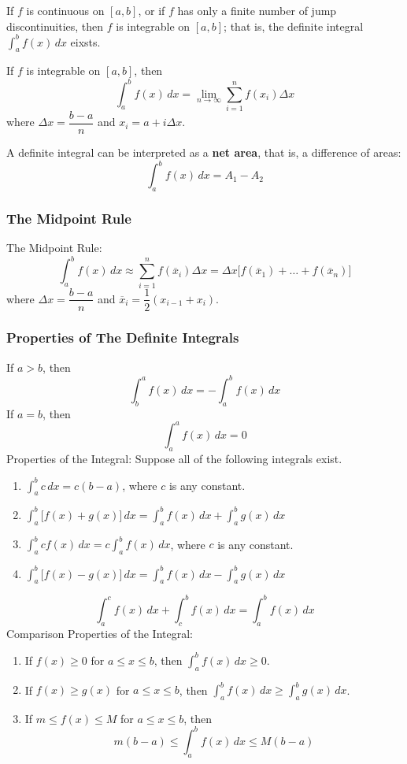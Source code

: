 \begin{theorem}
    If \(f\) is continuous on \([a,b]\), or if \(f\) has only a finite number
    of jump discontinuities, then \(f\) is integrable on \([a,b]\); that is,
    the definite integral \(\displaystyle{\int_a^b f(x)\,dx}\) eixsts.
\end{theorem}
\begin{theorem}
    If \(f\) is integrable on \([a,b]\), then
    \[\int_a^b f(x)\,dx=\lim_{n\to\infty}\sum_{i=1}^nf(x_i)\Delta x\]
    where \(\Delta x=\dfrac{b-a}{n}\) and \(x_i=a+i\Delta x\).
\end{theorem}
A definite integral can be interpreted as a \textbf{net area}, that is, a
difference of areas:
\[\int_a^b f(x)\,dx=A_1-A_2\]

\subsubsection*{The Midpoint Rule}
The Midpoint Rule:
\[\int_a^b f(x)\,dx\approx \sum_{i=1}^n f(\overline{x}_i)\Delta x
=\Delta x\big[f(\overline{x}_1)+\dots+f(\overline{x}_n)\big]\]
where \(\Delta x=\dfrac{b-a}{n}\) and
\(\overline{x}_i=\dfrac{1}{2}(x_{i-1}+x_i)\).

\subsubsection*{Properties of The Definite Integrals}
If \(a>b\), then
\[\int_b^a f(x)\,dx=-\int_a^b f(x)\,dx\]
If \(a=b\), then
\[\int_a^a f(x)\,dx=0\]
Properties of the Integral: Suppose all of the following integrals exist.
\begin{enumerate}
    \item \(\displaystyle{\int_a^b c\,dx=c(b-a)}\), where \(c\) is any
    constant.
    \item \(\displaystyle{\int_a^b\big[f(x)+g(x)\big]\,dx
    =\int_a^b f(x)\,dx+\int_a^b g(x)\,dx}\)
    \item \(\displaystyle{\int_a^b cf(x)\,dx=c\int_a^b f(x)\,dx}\), where
    \(c\) is any constant.
    \item \(\displaystyle{\int_a^b\big[f(x)-g(x)\big]\,dx
    =\int_a^b f(x)\,dx-\int_a^b g(x)\,dx}\)
\end{enumerate}
\[\int_a^c f(x)\,dx+\int_c^b f(x)\,dx=\int_a^b f(x)\,dx\]
Comparison Properties of the Integral:
\begin{enumerate}
    \item If \(f(x)\geq 0\) for \(a\leq x\leq b\),
    then \(\displaystyle{\int_a^b f(x)\,dx\geq 0}\).
    \item If \(f(x)\geq g(x)\) for \(a\leq x\leq b\),
    then \(\displaystyle{\int_a^b f(x)\,dx\geq \int_a^b g(x)\,dx}\).
    \item If \(m\leq f(x)\leq M\) for \(a\leq x\leq b\),
    then
    \[m(b-a)\leq\int_a^b f(x)\,dx\leq M(b-a)\]
\end{enumerate}